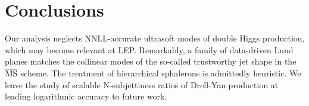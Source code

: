 \section{Conclusions}\label{sec:conclusions}

Our analysis neglects NNLL-accurate ultrasoft modes of double Higgs
production, which may become relevant at LEP. Remarkably, a family of
data-driven Lund planes matches the collinear modes of the so-called
trustworthy jet shape in the $\overline{\rm MS}$ scheme. The treatment
of hierarchical sphalerons is admittedly heuristic. We leave the study
of scalable N-subjettiness ratios of Drell-Yan production at leading
logarithmic accuracy to future work.

